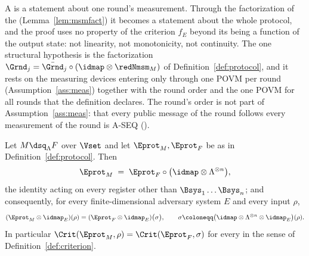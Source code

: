 
A  is a statement about one round's measurement.
Through the factorization of the 
(Lemma~\ref{lem:msmfact}) it
becomes a statement about the whole protocol, and the proof uses no property
of the criterion $f_E$ beyond its being a function of the output state: not
linearity, not monotonicity, not continuity. The one structural hypothesis is
the factorization $\Grnd_j=\bar{\Grnd}_j\circ(\idmap\otimes\redNmsm_M)$ of
Definition~\ref{def:protocol}, and it rests on the measuring devices
entering only through one POVM per round (Assumption~\ref{ass:meas})
together with the round order and the one POVM for all rounds that the
definition declares. The round's order is not part of
Assumption~\ref{ass:meas}: that every public message of the round follows
every measurement of the round is A-SEQ ().

\begin{theorem}
\label{thm:factorization}
Let $M\dsq_{\Lambda}F$ over $\Vset$ and let $\Eprot_M,\Eprot_F$ be as in
Definition~\ref{def:protocol}. Then
\begin{equation}\label{eq:factorization}
  \Eprot_M\;=\;\Eprot_F\circ\big(\idmap\otimes\Lambda^{\otimes n}\big),
\end{equation}
the identity acting on every register other than $\Bsys_1\dots\Bsys_n$; and
consequently, for every finite-dimensional adversary system $E$ and every input
$\rho$,
\begin{equation}\label{eq:sameoutput}
  (\Eprot_M\otimes\idmap_E)(\rho)
  =(\Eprot_F\otimes\idmap_E)\big(\sigma\big),
  \qquad
  \sigma\coloneqq\big(\idmap\otimes\Lambda^{\otimes n}\otimes\idmap_E\big)(\rho).
\end{equation}
In particular $\Crit(\Eprot_M,\rho)=\Crit(\Eprot_F,\sigma)$ for every
 in the sense of Definition~\ref{def:criterion}.
\end{theorem}

